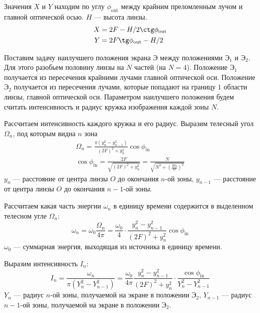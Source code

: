 \documentclass[a4paper, 12pt]{article}
\begin{document}
Значения $X$ и $Y$ находим по углу $\phi_\text{out}$ между крайним
преломленным лучом и главной оптической осью. $H$ --- высота
линзы.
\begin{equation}
    \begin{aligned}
        X &= 2F-H/2\ctg \phi_\text{out}\\
        Y &= 2F\tg \phi_\text{out} - H/2 
    \end{aligned}
    \label{eq:5}
\end{equation}

Поставим задачу наилучшего положения экрана $\text{Э}$ между
положениями $\text{Э}_1$ и $\text{Э}_2$. Для этого разобьем половину
линзы на $N$ частей (на  $N=4$). Положение $\text{Э}_1$
получается из пересечения крайними лучами главной оптической оси.
Положение $\text{Э}_2$ получается из пересечения лучами, которые
попадают на границу $1$ области линзы, главной
оптической оси. Параметром наилучшего положения будем считать
интенсивность и радиус кружка изображения каждой зоны $N$.

Рассчитаем интенсивность каждого кружка и его радиус. Выразим телесный
угол $\Omega_n$, под которым видна $n$ зона
\begin{equation}
    \begin{gathered}
    \Omega_n = \frac{\pi(y_n^2-y_{n-1}^2)}{(2F)^2+y_n^2}\cos
    \phi_{\text{in}} \\
    \cos \phi_\text{in} = \frac{2F}{\sqrt{(2F)^2 + y_n^2}} =
    \frac{N}{\sqrt{N^2 + \left( \frac{Hn}{4F} \right)^2}}
\end{gathered}
    \label{eq:6}
\end{equation}
$y_n$ --- расстояние от центра линзы $O$ до окончания $n$-ой зоны,
$y_{n-1}$ --- расстояние от центра линзы $O$ до окончания $n-1$-ой
зоны.

Рассчитаем какая часть энергии $\omega_n$ в единицу времени содержится
в выделенном телесном угле
$\Omega_n$:
\begin{equation}
    \omega_n = \omega_0 \frac{\Omega_n}{4\pi} = \frac{\omega_0}{4}\cdot
    \frac{y_n^2-y_{n-1}^2}{(2F)^2+y_n^2}\cos \phi_\text{in}
    \label{eq:7}
\end{equation}
$\omega_0$ --- суммарная энергия, выходящая из источника в единицу
времени.

Выразим интенсивность $I_n$:
\begin{equation}
    I_n = \frac{\omega_n}{\pi(Y_n^2-Y_{n-1}^2)} =
    \frac{\omega_0}{4\pi} \frac{y_n^2-y_{n-1}^2}{(2F)^2+y_n^2}\cdot
    \frac{\cos \phi_\text{in}}{Y_n^2-Y_{n-1}^2}
    \label{eq:8}
\end{equation}
$Y_n$ --- радиус $n$-ой зоны, получаемой на экране в положении
$\text{Э}_2$, $Y_{n-1}$ ---
радиус $n-1$-ой зоны, получаемой на экране в положении $\text{Э}_2$.
\end{document}
